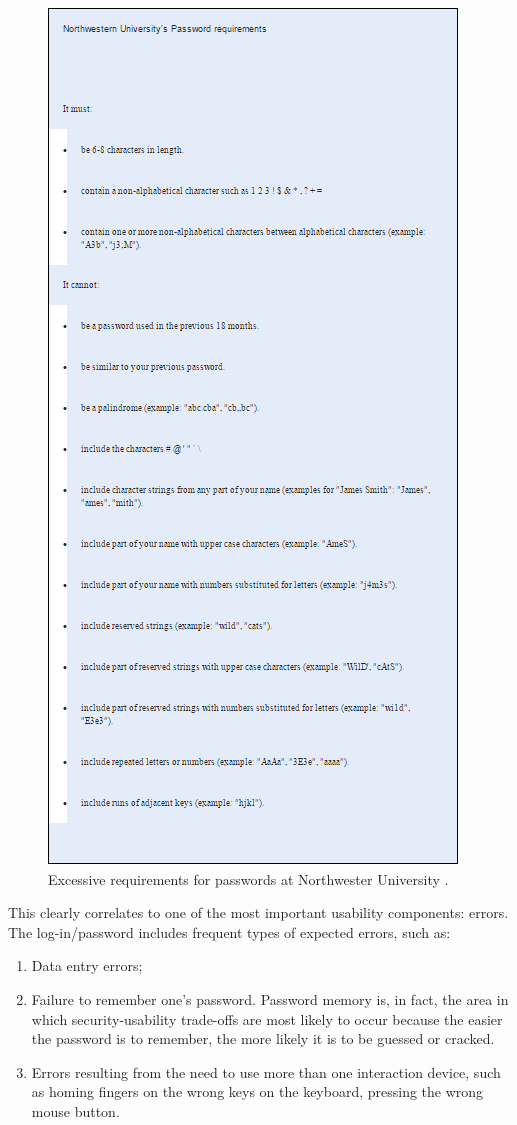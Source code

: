 \documentclass{article}
\begin{document}
\begin{figure}
  \centering
    \includegraphics[scale=0.8]{northwestern_password_requirements}
     \caption{Excessive requirements for passwords at Northwester University \cite{norman2009way}.}
\end{figure}

This clearly correlates to one of the most important usability components: errors.  The log-in/password includes frequent types of expected errors, such as:
\begin{enumerate}
\item Data entry errors;
\item Failure to remember one's password. Password memory is, in fact, the area in which security-usability trade-offs are most likely to occur because the easier the password is to remember, the more likely it is to be guessed or cracked. 
\item Errors resulting from the need to use more than one interaction device, such as homing fingers on the wrong keys on the keyboard, pressing the wrong mouse button. 
\end{enumerate}
\end{document}
